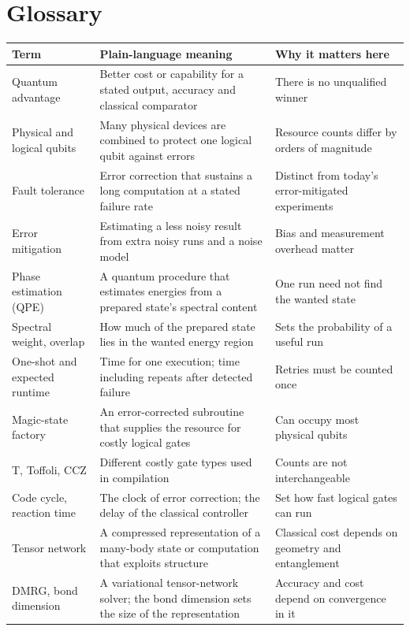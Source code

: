 \appendix

\section{Glossary}
\label{app:glossary}
{\small
\begin{longtable}{@{}L{3.4cm} L{7.1cm} L{5.2cm}@{}}
\toprule Term & Plain-language meaning & Why it matters here\\ \midrule\endhead
\bottomrule\endfoot
Quantum advantage & Better cost or capability for a stated output, accuracy and classical comparator & There is no unqualified winner\\
Physical and logical qubits & Many physical devices are combined to protect one logical qubit against errors & Resource counts differ by orders of magnitude\\
Fault tolerance & Error correction that sustains a long computation at a stated failure rate & Distinct from today's error-mitigated experiments\\
Error mitigation & Estimating a less noisy result from extra noisy runs and a noise model & Bias and measurement overhead matter\\
Phase estimation (QPE) & A quantum procedure that estimates energies from a prepared state's spectral content & One run need not find the wanted state\\
Spectral weight, overlap & How much of the prepared state lies in the wanted energy region & Sets the probability of a useful run\\
One-shot and expected runtime & Time for one execution; time including repeats after detected failure & Retries must be counted once\\
Magic-state factory & An error-corrected subroutine that supplies the resource for costly logical gates & Can occupy most physical qubits\\
T, Toffoli, CCZ & Different costly gate types used in compilation & Counts are not interchangeable\\
Code cycle, reaction time & The clock of error correction; the delay of the classical controller & Set how fast logical gates can run\\
Tensor network & A compressed representation of a many-body state or computation that exploits structure & Classical cost depends on geometry and entanglement\\
DMRG, bond dimension & A variational tensor-network solver; the bond dimension sets the size of the representation & Accuracy and cost depend on convergence in it\\

\end{longtable}}
